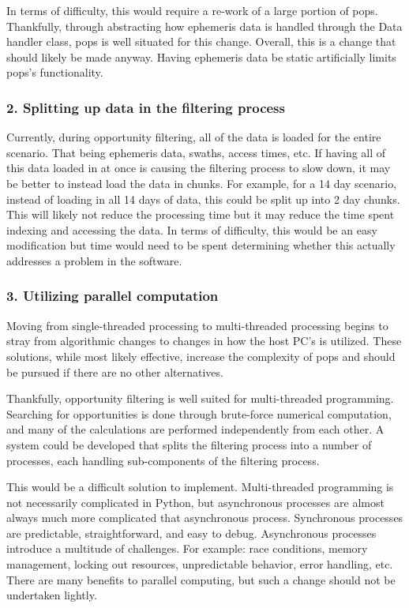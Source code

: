 In terms of difficulty, this would require a re-work of a large portion of
\gls{pops}.  Thankfully, through abstracting how ephemeris data is handled
through the Data handler class, \gls{pops} is well situated for this change.
Overall, this is a change that should likely be made anyway. Having ephemeris
data be static artificially limits \gls{pops}'s functionality.


\subsubsection{2. Splitting up data in the filtering process}

Currently, during opportunity filtering, all of the data is loaded for the
entire scenario. That being ephemeris data, swaths, access times, etc. If
having all of this data loaded in at once is causing the filtering process to
slow down, it may be better to instead load the data in chunks. For example,
for a 14 day scenario, instead of loading in all 14 days of data, this could be
split up into 2 day chunks. This will likely not reduce the processing time but
it may reduce the time spent indexing and accessing the data. In terms of
difficulty, this would be an easy modification but time would need to be spent
determining whether this actually addresses a problem in the software.


\subsubsection{3. Utilizing parallel computation}

Moving from single-threaded processing to multi-threaded processing begins to
stray from algorithmic changes to changes in how the host PC's is utilized.
These solutions, while most likely effective, increase the complexity of
\gls{pops} and should be pursued if there are no other alternatives.

Thankfully, opportunity filtering is well suited for multi-threaded
programming. Searching for opportunities is done through brute-force numerical
computation, and many of the calculations are performed independently from each
other. A system could be developed that splits the filtering process into a
number of processes, each handling sub-components of the filtering process. 

This would be a difficult solution to implement. Multi-threaded programming is
not necessarily complicated in Python, but asynchronous processes are almost
always much more complicated that asynchronous process. Synchronous processes
are predictable, straightforward, and easy to debug. Asynchronous processes
introduce a multitude of challenges. For example: race conditions, memory
management, locking out resources, unpredictable behavior, error handling, etc.
There are many benefits to parallel computing, but such a change should not be
undertaken lightly.


